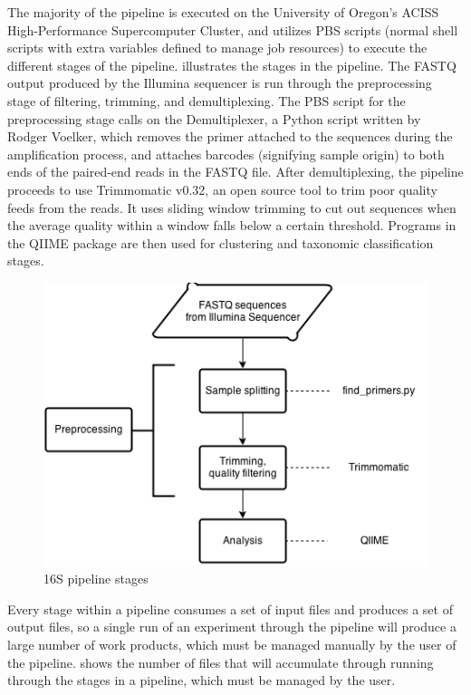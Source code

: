 \documentclass[12pt]{article}
\begin{document}
	The majority of the pipeline is executed on the University of Oregon’s ACISS High-Performance Supercomputer Cluster, and utilizes PBS scripts (normal shell scripts with extra variables defined to manage job resources) to execute the different stages of the pipeline.
	 illustrates the stages in the pipeline. The FASTQ output produced 
	by the Illumina sequencer is run through the preprocessing stage of filtering, 
	trimming, and demultiplexing. The PBS script for the preprocessing stage calls 
	on the Demultiplexer, a Python script written by Rodger Voelker, which removes the 
	primer attached to the sequences during the amplification process, and attaches barcodes 
	(signifying sample origin) to both ends of the paired-end reads in the FASTQ file. 
	After demultiplexing, the pipeline proceeds to use Trimmomatic v0.32, an open source 
	tool to trim poor quality feeds from the reads. It uses sliding window trimming to 
	cut out sequences when the average quality within a window falls below a certain threshold. 
	Programs in the QIIME package are then used for clustering and taxonomic classification stages.
	
	\begin{figure}[h!]
		\centering
		\includegraphics[width=\textwidth]{Pipeline}
		\caption{16S pipeline stages}
		\label{fig:pipeline}
	\end{figure}
	
	Every stage within a pipeline consumes a set of input files and produces a set 
	of output files, so a single run of an experiment through the pipeline will produce
	a large number of work products, which must be managed manually by the user of 
	the pipeline.  shows the number of files that will
	accumulate through running through the stages in a pipeline, which must be managed
	by the user.
	
\end{document}
